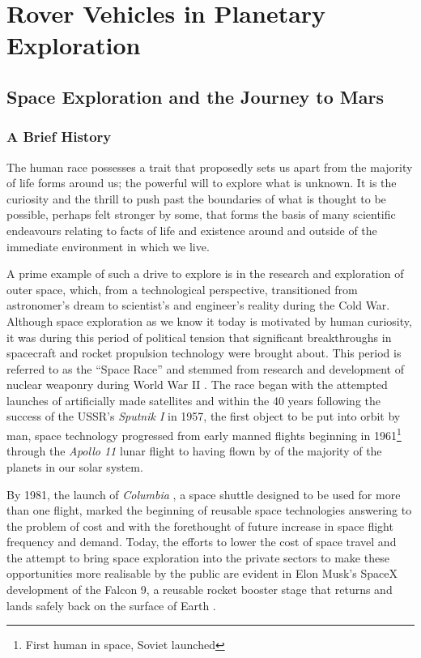 \chapter{Rover Vehicles in Planetary Exploration}
\label{chap:lit-review}
  \section{Space Exploration and the Journey to Mars}
    \subsection{A Brief History}
      The human race possesses a trait that proposedly sets us apart from the majority of life forms around us; the powerful will to explore what is unknown. It is the curiosity and the thrill to push past the boundaries of what is thought to be possible, perhaps felt stronger by some, that forms the basis of many scientific endeavours relating to facts of life and existence around and outside of the immediate environment in which we live.
      
      A prime example of such a drive to explore is in the research and exploration of outer space, which, from a technological perspective, transitioned from astronomer's dream to scientist's and engineer's reality during the Cold War. Although space exploration as we know it today is motivated by human curiosity, it was during this period of political tension that significant breakthroughs in spacecraft and rocket propulsion technology were brought about. This period is referred to as the ``Space Race'' and stemmed from research and development of nuclear weaponry during World War II \cite[p. 147]{cornwell2003hitler}. The race began with the attempted launches of artificially made satellites \cite[pp. 3-5]{schefter1999the} and within the 40 years following the success of the USSR's \textit{Sputnik I} in 1957, the first object to be put into orbit by man, space technology progressed from early manned flights beginning in 1961\footnote{First human in space, Soviet launched} through the \textit{Apollo 11} lunar flight to having flown by of the majority of the planets in our solar system.
      
      By 1981, the launch of \textit{Columbia} \cite{williamharwood2009}, a space shuttle designed to be used for more than one flight, marked the beginning of reusable space technologies answering to the problem of cost and with the forethought of future increase in space flight frequency and demand. Today, the efforts to lower the cost of space travel and the attempt to bring space exploration into the private sectors to make these opportunities more realisable by the public are evident in Elon Musk's SpaceX development of the Falcon 9, a reusable rocket booster stage that returns and lands safely back on the surface of Earth \cite{spacex_popularmechanics}.
      

